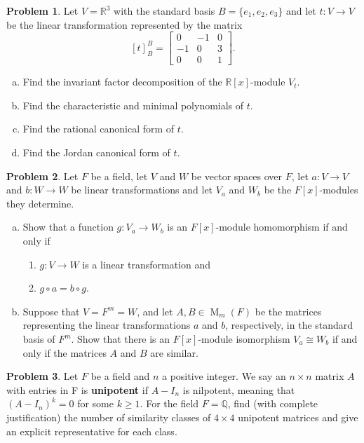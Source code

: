 \documentclass[11pt]{article}
\DeclareMathOperator{\M}{M}
\newcommand{\Q}{\mathbb{Q}}
\newcommand{\R}{\mathbb{R}}
\theoremstyle{definition}
\newtheorem{problem}{Problem}
\begin{document}
\begin{problem}
Let $V = \R^3$ with the standard basis $B=\{e_1,e_2,e_3\}$ and let $t: V \to V$ be the linear transformation represented by the matrix 
$$[t]_B^B =
\begin{bmatrix}
0	&	-1	&	0\\
-1	&	0	&	3\\	
0	&	0	&	1	
\end{bmatrix}.$$ 

\begin{enumerate}[a)]
\item Find the invariant factor decomposition of the $\R[x]$-module $V_t$. 
\item Find the characteristic and minimal polynomials of $t$.
\item Find the rational canonical form of $t$.
\item Find the Jordan canonical form of $t$.
\end{enumerate}	
\end{problem}





\begin{problem}
Let $F$ be a field, let $V$ and $W$ be vector spaces over $F$, let $a\!: V \to V$ and $b\!:W \to W$ be linear transformations and let $V_a$ and $W_b$ be the $F[x]$-modules they determine. 
\begin{enumerate}[a)]
\item Show that a function $g: V_a \to W_b$ is an $F[x]$-module homomorphism if and only if 
\begin{enumerate}[(1)]
\item $g: V \to W$ is a linear transformation and 
\item $g \circ a = b \circ g$.
\end{enumerate} 
\item Suppose that $V = F^m = W$, and let $A, B \in \M_m(F)$ be the matrices representing the linear transformations $a$ and $b$, respectively, in the standard basis of $F^m$. Show that there is an $F[x]$-module isomorphism $V_a \cong W_b$ if and only if the matrices $A$ and $B$ are similar.
\end{enumerate}
\end{problem}
\begin{problem}
Let $F$ be a field and $n$ a positive integer. We say an $n \times n$ matrix $A$ with entries in F is {\bf unipotent} if $A-I_n$ is nilpotent, meaning that $(A-I_n)^k = 0$ for some $k \geqslant 1$. For the field $F = \Q$, find (with complete justification) the number of similarity classes of $4 \times 4$ unipotent matrices and give an explicit representative for each class.
\end{problem}
\end{document}
